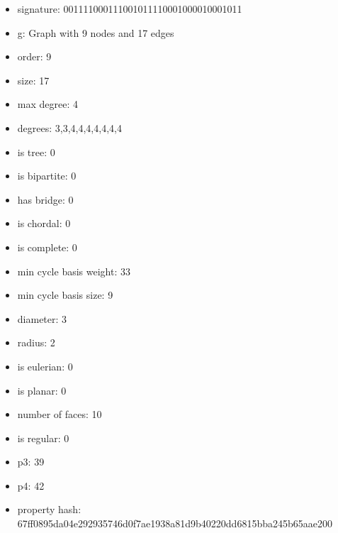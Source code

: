 \newpage
\begin{figure}
\end{figure}
\begin{itemize}
\item signature: 001111000111001011110001000010001011
\item g: Graph with 9 nodes and 17 edges
\item order: 9
\item size: 17
\item max degree: 4
\item degrees: 3,3,4,4,4,4,4,4,4
\item is tree: 0
\item is bipartite: 0
\item has bridge: 0
\item is chordal: 0
\item is complete: 0
\item min cycle basis weight: 33
\item min cycle basis size: 9
\item diameter: 3
\item radius: 2
\item is eulerian: 0
\item is planar: 0
\item number of faces: 10
\item is regular: 0
\item p3: 39
\item p4: 42
\item property hash: 67ff0895da04e292935746d0f7ae1938a81d9b40220dd6815bba245b65aae200
\end{itemize}

